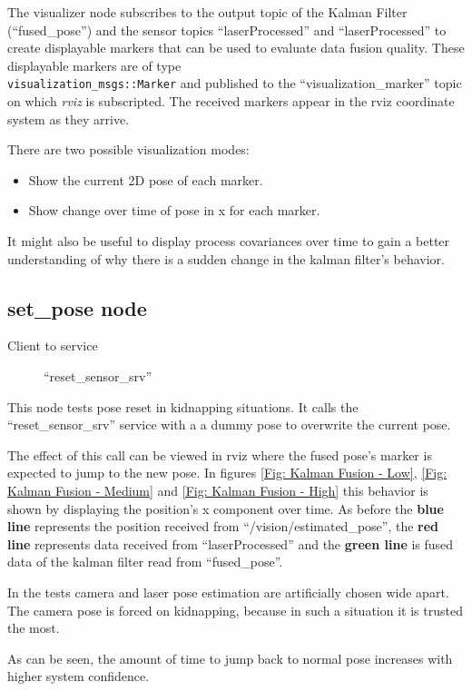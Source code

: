 The visualizer node subscribes to the output topic of the Kalman Filter (``fused\_pose'') and the sensor topics ``laserProcessed'' and ``laserProcessed'' to create displayable markers that can be used to evaluate data fusion quality. These displayable markers are of type \\ \texttt{visualization\_msgs::Marker} and published to the ``visualization\_marker'' topic on which \textit{rviz} is subscripted. The received markers appear in the rviz coordinate system as they arrive.

There are two possible visualization modes:

\begin{itemize}
\item Show the current 2D pose of each marker.
\item Show change over time of pose in x for each marker.
\end{itemize}

It might also be useful to display process covariances over time to gain a better understanding of why there is a sudden change in the kalman filter's behavior.

\subsection{set\_pose node}
\begin{description}
\item[Client to service] ``reset\_sensor\_srv''
\end{description}
This node tests pose reset in kidnapping situations. It calls the ``reset\_sensor\_srv'' service with a a dummy pose to overwrite the current pose.

The effect of this call can be viewed in rviz where the fused pose's marker is expected to jump to the new pose. In figures \ref{Fig: Kalman Fusion - Low}, \ref{Fig: Kalman Fusion - Medium} and \ref{Fig: Kalman Fusion - High} this behavior is shown by displaying the position's x component over time. As before the \textbf{blue line} represents the position received from ``/vision/estimated\_pose'', the \textbf{red line} represents data received from ``laserProcessed'' and the \textbf{green line} is fused data of the kalman filter read from ``fused\_pose''.

In the tests camera and laser pose estimation are artificially chosen wide apart. The camera pose is forced on kidnapping, because in such a situation it is trusted the most.

As can be seen, the amount of time to jump back to normal pose increases with higher system confidence.

